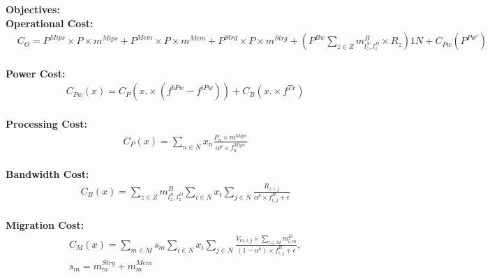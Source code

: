 \documentclass{article}
\begin{document}
\pagebreak

\noindent\textbf{Objectives:}\\[12pt]
\noindent\textbf{Operational Cost:}\\[6pt]
\begin{equation*}
\begin{split}
	& C_O = P^{Mips} \times P \times m^{Mips} + P^{Mem} \times P \times m^{Mem} + P^{Strg}\times P\times m^{Strg} + \left(P^{Bw} \sum_{z\in Z} m^B_{l^S_z,l^D_z} \times R_z\right)1N + C_{Pw}(P^{Pw'})
\end{split}
\end{equation*}\\[6pt]

\noindent\textbf{Power Cost:}\\[6pt]
\begin{equation*}
\begin{aligned}
& C_{Pw}(x) = C_P(x.\times(f^{bPw} - f^{iPw})) + C_B(x.\times f^{Tx})
\end{aligned}
\end{equation*}\\[6pt]

\noindent\textbf{Processing Cost:}\\[6pt]
\begin{equation*}
\begin{aligned}
& C_P(x) = \sum_{n\in N} x_n \frac{P_n \times m^{Mips}}{\alpha^p \times f_n^{Mips}}
\end{aligned}
\end{equation*}\\[6pt]

\noindent\textbf{Bandwidth Cost:}\\[6pt]
\begin{equation*}
\begin{split}
& C_B(x) = \sum_{z\in Z} m^B_{l^S_z,l^D_z} \sum_{i\in N} x_i \sum_{j\in N} \frac{R_{z, i,j}}{\alpha^b \times f^B_{i,j} + \epsilon}
\end{split}
\end{equation*}\\[6pt]

\noindent\textbf{Migration Cost:}\\[6pt]
\begin{equation*}
\begin{split}
& C_M(x) = \sum_{m\in M} s_m \sum_{i\in N} x_i \sum_{j\in N} \frac{V_{m, i,j} \times \sum_{l\in M} m^D_{l, m} }{\left(1 - \alpha^b\right) \times f^B_{i,j} + \epsilon}, \\[6pt]
& s_m = m^{Strg}_{m} + m^{Mem}_{m}
\end{split}
\end{equation*}\\[6pt]
\end{document}
